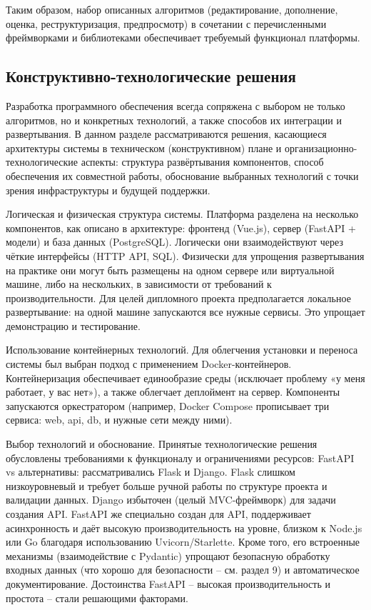 Таким образом, набор описанных алгоритмов (редактирование, дополнение, оценка, реструктуризация, предпросмотр) в сочетании с перечисленными фреймворками и библиотеками обеспечивает требуемый функционал платформы.

\subsection{Конструктивно-технологические решения}
Разработка программного обеспечения всегда сопряжена с выбором не только алгоритмов, но и конкретных технологий, а также способов их интеграции и развертывания. В данном разделе рассматриваются решения, касающиеся архитектуры системы в техническом (конструктивном) плане и организационно-технологические аспекты: структура развёртывания компонентов, способ обеспечения их совместной работы, обоснование выбранных технологий с точки зрения инфраструктуры и будущей поддержки.

\par Логическая и физическая структура системы. Платформа разделена на несколько компонентов, как описано в архитектуре: фронтенд (Vue.js), сервер (FastAPI + модели) и база данных (PostgreSQL). Логически они взаимодействуют через чёткие интерфейсы (HTTP API, SQL). Физически для упрощения развертывания на практике они могут быть размещены на одном сервере или виртуальной машине, либо на нескольких, в зависимости от требований к производительности.
Для целей дипломного проекта предполагается локальное развертывание: на одной машине запускаются все нужные сервисы. Это упрощает демонстрацию и тестирование.

Использование контейнерных технологий. Для облегчения установки и переноса системы был выбран подход с применением Docker-контейнеров.
Контейнеризация обеспечивает единообразие среды (исключает проблему «у меня работает, у вас нет»), а также облегчает деплоймент на сервер. Компоненты запускаются оркестратором (например, Docker Compose прописывает три сервиса: web, api, db, и нужные сети между ними).

Выбор технологий и обоснование. Принятые технологические решения обусловлены требованиями к функционалу и ограничениями ресурсов:
FastAPI vs альтернативы: рассматривались Flask и Django. Flask слишком низкоуровневый и требует больше ручной работы по структуре проекта и валидации данных. Django избыточен (целый MVC-фреймворк) для задачи создания API. FastAPI же специально создан для API, поддерживает асинхронность и даёт высокую производительность на уровне, близком к Node.js или Go благодаря использованию Uvicorn/Starlette\cite{easyoffer:fastapi}. Кроме того, его встроенные механизмы (взаимодействие с Pydantic) упрощают безопасную обработку входных данных (что хорошо для безопасности – см. раздел 9) и автоматическое документирование. Достоинства FastAPI – высокая производительность и простота – стали решающими факторами\cite{fastapi:practicum}.

